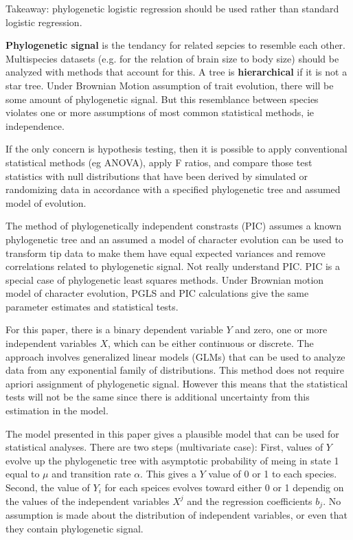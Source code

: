 \documentclass{article}
\newcommand{\bnote}[1]{{\blue #1 }} %
\begin{document}
Takeaway: phylogenetic logistic regression should be used rather than standard
logistic regression.


\textbf{Phylogenetic signal} is the tendancy for related sepcies to resemble
each other. Multispecies datasets (e.g. for the relation of brain size to body
size) should be analyzed with methods that account for this. A tree is
\textbf{hierarchical} if it is not a star tree. Under Brownian Motion assumption
of trait evolution, there will be some amount of phylogenetic signal. But this
resemblance between species violates one or more assumptions of most common
statistical methods, ie independence.

If the only concern is hypothesis testing, then it is possible to apply
conventional statistical methods (eg ANOVA), apply F ratios, and compare those
test statistics with null distributions that have been derived by simulated or
randomizing data in accordance with a specified phylogenetic tree and assumed
model of evolution.

The method of phylogenetically independent constrasts (PIC) assumes a known
phylogenetic tree and an assumed a model of character evolution can be used to
transform tip data to make them have equal expected variances and remove
correlations related to phylogenetic signal. \bnote{Not really understand PIC.}
PIC is a special case of phylogenetic least squares methods. Under Brownian
motion model of character evolution, PGLS and PIC calculations give the same
parameter estimates and statistical tests.

For this paper, there is a binary dependent variable $Y$ and zero, one or more
independent variables $X$, which can be either continuous or discrete. The
approach involves generalized linear models (GLMs) that can be used to analyze
data from any exponential family of distributions. This method does not require
apriori assignment of phylogenetic signal. However this means that the 
statistical tests will not be the same since there is additional uncertainty
from this estimation in the model.  

The model presented in this paper gives a plausible model that can be used for
statistical analyses. There are two steps (multivariate case): First, values of
$Y$ evolve up the phylogenetic tree with asymptotic probability of meing in
state 1 equal to $\mu$ and transition rate $\alpha$. This gives a $Y$ value of 0
or 1 to each species. Second, the value of $Y_{i}$ for each speices evolves
toward either 0 or 1 dependig on the values of the independent variables $X^{j}$
and the regression coefficients $b_{j}$. No assumption is made about the
distribution of independent variables, or even that they contain phylogenetic
signal.
\end{document}
